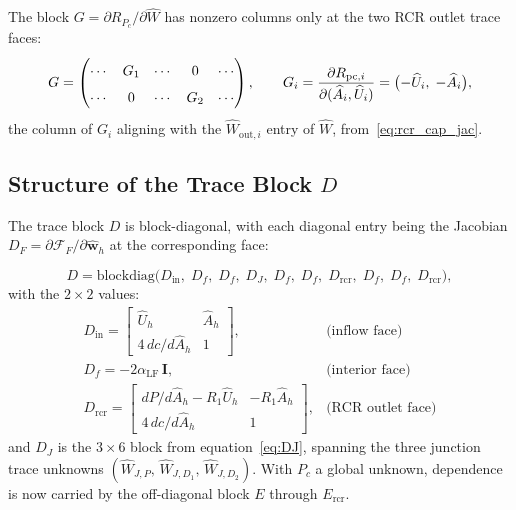 \documentclass[11pt]{article}
\begin{document}
The block $G=\partial R_{P_c}/\partial\widehat{W}$ has nonzero columns only at
the two RCR outlet trace faces:
\begin{equation}
G
=
\renewcommand{\arraystretch}{1.6}
\begin{pmatrix}
\cdots & G_1 & \cdots & 0   & \cdots \\
\cdots & 0   & \cdots & G_2 & \cdots
\end{pmatrix},
\qquad
G_i
=
\frac{\partial R_{\mathrm{pc},i}}{\partial(\widehat{A}_i,\widehat{U}_i)}
=
\bigl(-\widehat{U}_i,\;-\widehat{A}_i\bigr),
\label{eq:G_block}
\end{equation}
the column of $G_i$ aligning with the $\widehat{W}_{\mathrm{out},i}$ entry of
$\widehat{W}$, from~\eqref{eq:rcr_cap_jac}.

\subsection{Structure of the Trace Block $D$}

The trace block $D$ is block-diagonal, with each diagonal entry
being the Jacobian $D_F = \partial\mathcal{F}_F/\partial
\widehat{\mathbf{w}}_h$ at the corresponding face:

\begin{equation}
D
=
\mathrm{blockdiag}
\bigl(
D_{\mathrm{in}},\;
D_{f},\;
D_{f},\;
D_{J},\;
D_{f},\;
D_{f},\;
D_{\mathrm{rcr}},\;
D_{f},\;
D_{f},\;
D_{\mathrm{rcr}}
\bigr),
\label{eq:D_blockdiag}
\end{equation}
with the $2\times2$ values:
\begin{equation}
\renewcommand{\arraystretch}{1.8}
\begin{array}{ll}
D_{\mathrm{in}}
=
\begin{bmatrix}
\widehat{U}_h & \widehat{A}_h \\
4\,dc/d\widehat{A}_h & 1
\end{bmatrix},
&
\text{(inflow face)}
\\[10pt]
D_{f}
=
-2\alpha_{\mathrm{LF}}\,\mathbf{I},
&
\text{(interior face)}
\\[10pt]
D_{\mathrm{rcr}}
=
\begin{bmatrix}
dP/d\widehat{A}_h - R_1\widehat{U}_h
& -R_1\widehat{A}_h \\
4\,dc/d\widehat{A}_h & 1
\end{bmatrix},
&
\text{(RCR outlet face)}
\end{array}
\label{eq:D_blocks_summary}
\end{equation}
and $D_J$ is the $3\times6$ block from equation~\eqref{eq:DJ},
spanning the three junction trace unknowns
$(\widehat{W}_{J,P},\, \widehat{W}_{J,D_1},\, \widehat{W}_{J,D_2})$.
With $P_c$ a global unknown, dependence is now carried by the off-diagonal block
$E$ through $E_{\mathrm{rcr}}$.
\end{document}
